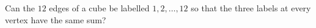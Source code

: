 Can the $12$ edges of a cube be labelled $1,2,\dots,12$ so that the three labels at every vertex have the same sum?
